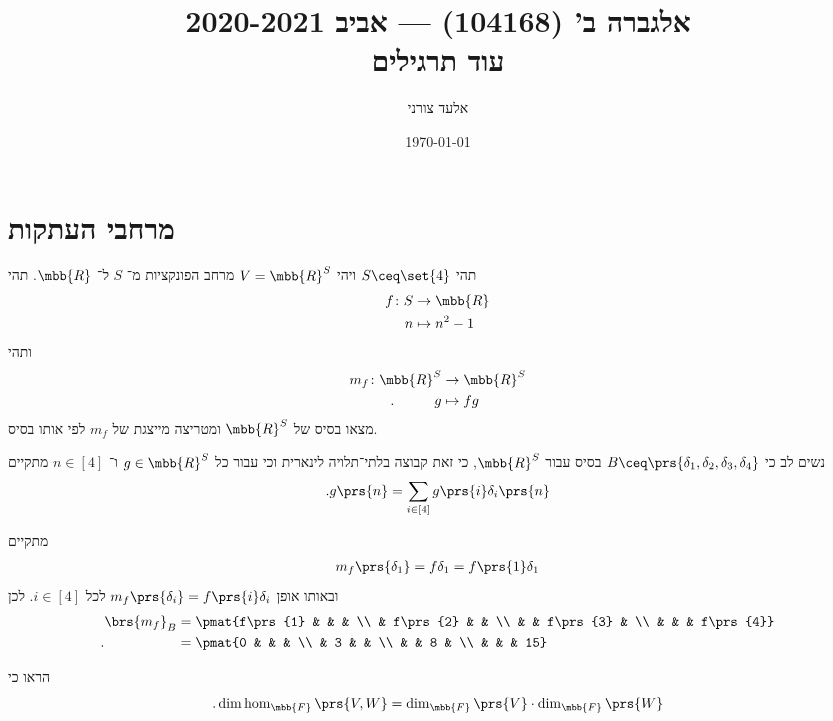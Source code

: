\documentclass[a4paper,10pt,oneside,openany]{article}
\title{
אלגברה ב' (104168) \textenglish{---} אביב 2020-2021
\\
עוד תרגילים
}
\author{אלעד צורני}
\date{\today}
\begin{document}
\maketitle

\setcounter{section}{1}

\section{מרחבי העתקות}

\begin{exercise}
תהי
$S \ceq \set{4}$
ויהי
$V = \mbb{R}^S$
מרחב הפונקציות מ־%
$S$
ל־%
$\mbb{R}$.
תהי
\begin{align*}
f \colon S &\to \mbb{R} \\
n &\mapsto n^2 - 1
\end{align*}
ותהי
\begin{align*}
m_f \colon \mbb{R}^S &\to \mbb{R}^S \\
\text{.} \hphantom{lalalal} g &\mapsto fg
\end{align*}
מצאו בסיס של
$\mbb{R}^S$
ומטריצה מייצגת של $m_f$ לפי אותו בסיס.
\end{exercise}

\begin{solution}
נשים לב כי
$B \ceq \prs{\delta_1, \delta_2, \delta_3, \delta_4}$
בסיס עבור
$\mbb{R}^S$,
כי זאת קבוצה בלתי־תלויה לינארית וכי עבור כל
$g \in \mbb{R}^S$
ו־%
$n \in [4]$
מתקיים
\[\text{.} g\prs{n} = \sum_{i \in [4]} g\prs{i} \delta_i\prs{n}\]

מתקיים
\begin{align*}
m_f\prs{\delta_1} = f\delta_1 = f\prs{1} \delta_1
\end{align*}
ובאותו אופן
$m_f\prs{\delta_i} = f\prs{i} \delta_i$
לכל
$i \in [4]$.
לכן
\begin{align*}
\brs{m_f}_B &= \pmat{f\prs{1} & & & \\ & f\prs{2} & & \\ & & f\prs{3} & \\ & & & f\prs{4}}
\\ \text{.} \hphantom{\brs{m_f}_B} &= \pmat{0 & & & \\ & 3 & & \\ & & 8 & \\ & & & 15}
\end{align*}
\end{solution}

\begin{exercise}
הראו כי
\[\text{.} \dim \hom_{\mbb{F}}\prs{V,W} = \dim_{\mbb{F}}\prs{V} \cdot \dim_{\mbb{F}}\prs{W}\]
\end{exercise}
\end{document}
